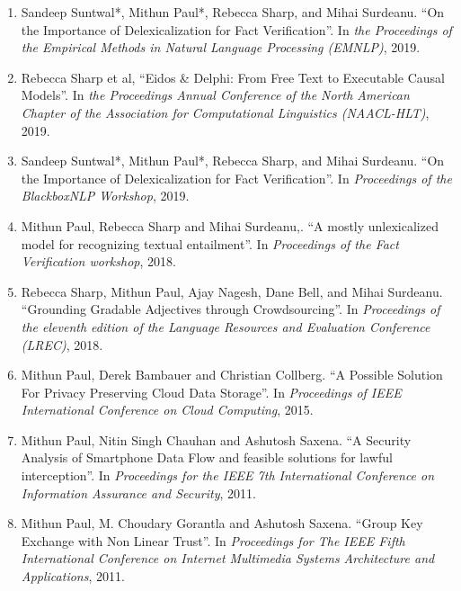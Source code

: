 \documentclass[10pt]{article}
\newcommand{\ve}[1]{{\em #1}} %
\newcommand{\ti}[1]{``#1''} %
\begin{document}
\begin{description}
\begin{enumerate}
\item Sandeep Suntwal*, Mithun Paul*, Rebecca Sharp, and Mihai Surdeanu.   \ti{On the Importance of Delexicalization for Fact Verification}. In \ve{the Proceedings of the Empirical Methods in Natural Language Processing (EMNLP)}, 2019.

\item  Rebecca Sharp et al,   \ti{Eidos \& Delphi: From Free Text to Executable Causal Models}. In \ve{ the Proceedings Annual Conference of the North American Chapter of the Association for Computational Linguistics (NAACL-HLT)}, 2019.

\end{enumerate}


\begin{enumerate}
\setcounter{enumi}{2}



\item Sandeep Suntwal*, Mithun Paul*, Rebecca Sharp, and Mihai Surdeanu.   \ti{On the Importance of Delexicalization for Fact Verification}. In \ve{Proceedings of the BlackboxNLP Workshop}, 2019.

\item Mithun Paul, Rebecca Sharp and Mihai Surdeanu,.   \ti{A mostly unlexicalized model for recognizing textual entailment}. In \ve{Proceedings of the Fact Verification workshop}, 2018.

\item Rebecca Sharp, Mithun Paul, Ajay Nagesh, Dane  Bell, and Mihai Surdeanu.   \ti{Grounding Gradable Adjectives through Crowdsourcing}. In \ve{Proceedings of the eleventh edition of the Language Resources and Evaluation Conference (LREC)}, 2018.

\item Mithun Paul, Derek Bambauer and Christian Collberg.   \ti{A Possible Solution For Privacy Preserving Cloud Data Storage}. In \ve{Proceedings of IEEE International Conference on Cloud Computing}, 2015.

\item  Mithun Paul, Nitin Singh Chauhan and Ashutosh Saxena.   \ti{A Security Analysis of Smartphone Data Flow and feasible solutions for lawful interception}. In \ve{ Proceedings for the IEEE 7th International Conference on Information Assurance and Security}, 2011.

\item  Mithun Paul, M. Choudary Gorantla and Ashutosh Saxena.   \ti{Group Key Exchange with Non Linear Trust}. In \ve{ Proceedings for The IEEE Fifth International Conference on Internet Multimedia Systems Architecture and Applications}, 2011.


\end{enumerate}
\end{description}
\end{document}
